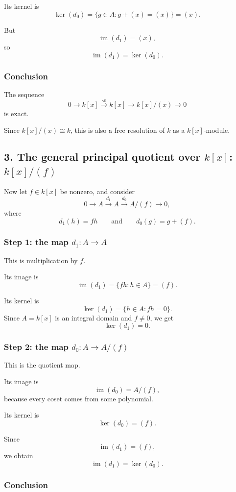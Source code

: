 \documentclass[12pt,a4paper]{article}
\theoremstyle{notespace}
\theoremstyle{definition}
\begin{document}
Its kernel is
\[
\ker(d_0)=\{g\in A : g+(x)=(x)\}=(x).
\]

But
\[
\operatorname{im}(d_1)=(x),
\]
so
\[
\operatorname{im}(d_1)=\ker(d_0).
\]

\subsubsection*{Conclusion}

The sequence
\[
0 \longrightarrow k[x] \xrightarrow{\cdot x} k[x] \longrightarrow k[x]/(x) \longrightarrow 0
\]
is exact.

Since \(k[x]/(x)\cong k\), this is also a free resolution of \(k\) as a \(k[x]\)-module.

\bigskip

\subsection{3. The general principal quotient over \(k[x]\): \(k[x]/(f)\)}

Now let \(f\in k[x]\) be nonzero, and consider
\[
0 \longrightarrow A \xrightarrow{d_1} A \xrightarrow{d_0} A/(f) \longrightarrow 0,
\]
where
\[
d_1(h)=fh
\qquad\text{and}\qquad
d_0(g)=g+(f).
\]

\subsubsection*{Step 1: the map \(d_1:A\to A\)}

This is multiplication by \(f\).

Its image is
\[
\operatorname{im}(d_1)=\{fh : h\in A\}=(f).
\]

Its kernel is
\[
\ker(d_1)=\{h\in A : fh=0\}.
\]
Since \(A=k[x]\) is an integral domain and \(f\neq 0\), we get
\[
\ker(d_1)=0.
\]

\subsubsection*{Step 2: the map \(d_0:A\to A/(f)\)}

This is the quotient map.

Its image is
\[
\operatorname{im}(d_0)=A/(f),
\]
because every coset comes from some polynomial.

Its kernel is
\[
\ker(d_0)=(f).
\]

Since
\[
\operatorname{im}(d_1)=(f),
\]
we obtain
\[
\operatorname{im}(d_1)=\ker(d_0).
\]

\subsubsection*{Conclusion}
\end{document}
